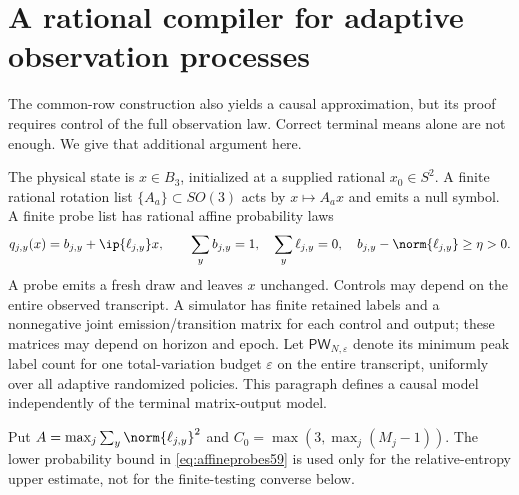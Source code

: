 \section{A rational compiler for adaptive observation processes}
\label{sec:adaptivecompiler59}
The common-row construction also yields a causal approximation, but its
proof requires control of the full observation law. Correct terminal
means alone are not enough. We give that additional argument here.

The physical state is $x\in B_3$, initialized at a supplied rational
$x_0\in S^2$. A finite rational rotation list $\{A_a\}\subset SO(3)$
acts by $x\mapsto A_ax$ and emits a null symbol. A finite probe list has
rational affine probability laws
\begin{equation}\label{eq:affineprobes59}
 q_{j,y}(x)=b_{j,y}+\ip{\ell_{j,y}}x,\qquad
 \sum_y b_{j,y}=1,\quad \sum_y\ell_{j,y}=0,
 \quad b_{j,y}-\norm{\ell_{j,y}}\ge\eta>0.
\end{equation}
A probe emits a fresh draw and leaves $x$ unchanged. Controls may depend
on the entire observed transcript. A simulator has finite retained
labels and a nonnegative joint emission/transition matrix for each
control and output; these matrices may depend on horizon and epoch.
Let $\mathsf{PW}_{N,\varepsilon}$ denote its minimum peak label count
for one total-variation budget $\varepsilon$ on the entire transcript,
uniformly over all adaptive randomized policies. This paragraph defines
a causal model independently of the terminal matrix-output model.

Put $A=\max_j\sum_y\norm{\ell_{j,y}}^2$ and
$C_0=\max(3,\max_j(M_j-1))$. The lower probability bound in
\eqref{eq:affineprobes59} is used only for the relative-entropy upper
estimate, not for the finite-testing converse below.

